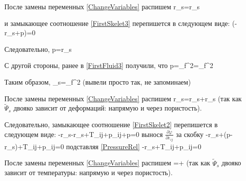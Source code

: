 \documentclass[main.tex]{subfiles}
\begin{document}
После замены переменных \eqref{ChangeVariables} распишем
\beq
r_s=r_s
\eeq

и замыкающее соотношение \eqref{FirstSkelet3} перепишется в следующем виде:
\beq
\left(-r_s+p\right)=0
\eeq

Следовательно,
\beq\label{PressureRel}
p=r_s
\eeq

С другой стороны, ранее в \eqref{FirstFluid3} получили, что
\beq
p=\rho_f^2=\rho_f^2
\eeq

Таким образом,
\beq
\varphi\rho_s=\rho_f^2
\eeq
(вывели просто так, не запоминаем)

После замены переменных \eqref{ChangeVariables} распишем 
\beq
r_s=r_s+r_s
\eeq
(так как $\tilde{\Psi}_s$ двояко зависит от деформаций: напрямую и через пористость).

Следовательно, замыкающее соотношение \eqref{FirstSkelet2} перепишется в следующем виде:
\beq
-r_s-r_s+T_{ij}+p\varphi\delta_{ij}+p=0
\eeq
вынося $\displaystyle{}\frac{\partial\varphi}{\partial\varepsilon_{ij}}$ за скобку
\beq
-r_s+\left(p-r_s\right)+T_{ij}+p\varphi\delta_{ij}=0
\eeq
подставляя \eqref{PressureRel}
\beq\label{SecondSkelet2}
-r_s+T_{ij}+p\varphi\delta_{ij}=0
\eeq

После замены переменных \eqref{ChangeVariables} распишем
\beq
{}=+\frac{\partial\varphi}{\partial\theta}
\eeq
(так как $\tilde{\Psi}_s$ двояко зависит от температуры: напрямую и через пористость).
\end{document}
